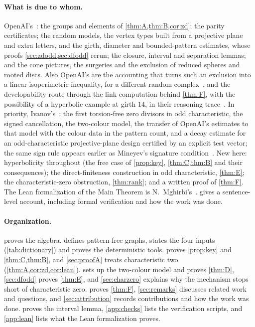 \documentclass[11pt]{article}
\theoremstyle{definition}
\theoremstyle{plain}
\begin{document}
\paragraph{What is due to whom.} OpenAI's~\cite{OAI196,OAI197a}: the groups and elements of \cref{thm:A,thm:B,cor:zd}; the parity certificates; the random models, the vertex types built from a projective plane and extra letters, and the girth, diameter and bounded-pattern estimates, whose proofs \cref{sec:zdodd,sec:dfodd} rerun; the closure, interval and separation lemmas; and the cone pictures, the surgeries and the exclusion of reduced spheres and rooted discs. Also OpenAI's are the accounting that turns such an exclusion into a linear isoperimetric inequality, for a different random complex~\cite[Thm.~3.1]{OAI257}, and the developability route through the link computation behind \cref{thm:F}, with the possibility of a hyperbolic example at girth $14$, in their reasoning trace~\cite[\S\S12, 17 and~21]{OAItrace}. In priority, Ivanov's~\cite{Ivanov2026}: the first torsion-free zero divisors in odd characteristic, the signed cancellation, the two-colour model, the transfer of OpenAI's estimates to that model with the colour data in the pattern count, and a decay estimate for an odd-characteristic projective-plane design certified by an explicit test vector; the same sign rule appears earlier as Mineyev's signature condition~\cite[\S2.2]{Mineyev2024}. New here: hyperbolicity throughout (the free case of \cref{prop:key}, \cref{thm:C,thm:B} and their consequences); the direct-finiteness construction in odd characteristic, \cref{thm:E}; the characteristic-zero obstruction, \cref{thm:rank}; and a written proof of \cref{thm:F}. The Lean formalization of the Main Theorem is N.~Mghirbi's~\cite{MghirbiLean}.  gives a sentence-level account, including formal verification and how the work was done.

\paragraph{Organization.}  proves the algebra.  defines pattern-free graphs, states the four inputs (\cref{tab:dictionary}) and proves the deterministic tools.  proves \cref{prop:key} and \cref{thm:C,thm:B}, and \cref{sec:proofA} treats characteristic two (\cref{thm:A,cor:zd,cor:lean}).  sets up the two-colour model and proves \cref{thm:D}, \cref{sec:dfodd} proves \cref{thm:E}, and \cref{sec:charzero} explains why the mechanism stops short of characteristic zero.  proves \cref{thm:F}, \cref{sec:remarks} discusses related work and questions, and \cref{sec:attribution} records contributions and how the work was done.  proves the interval lemma, \cref{app:checks} lists the verification scripts, and \cref{app:lean} lists what the Lean formalization proves.
\end{document}
